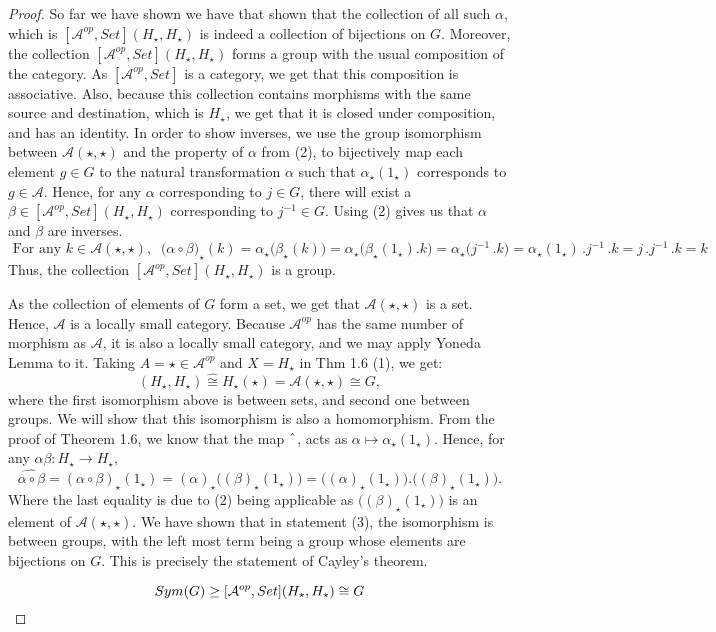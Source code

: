 \documentclass[18pt,a4paper]{article}
\theoremstyle{definition}
\begin{document}
\begin{proof}
		 So far we have shown we have that shown that the collection of all such $\alpha$,
		 which is $[\mathcal{A} ^{op},Set](H_\star,H_\star)$ is indeed a
		 collection of bijections on $G$.
		 Moreover, the collection $[\mathcal{A} ^{op},Set](H_\star, H_\star)$
		forms a group with the usual composition of the category.
		As $[\mathcal{A} ^{op},Set]$ is a category, we get that
		this composition is associative. Also, because this collection contains
		morphisms with the same source and destination, which is $H_\star$, we get that it is
		closed under composition, and has an identity.
		In order to show inverses, we use the group isomorphism between
		$\mathcal{A} (\star,\star)$ and	the property of $\alpha$ from (2),
		to bijectively map each element $g\in G$ to the natural transformation $\alpha$
		such that $\alpha_\star(1_\star)$ corresponds to $g \in \mathcal{A}$.
		Hence, for any $\alpha$ corresponding to $j\in G$, there will exist a
		$\beta \in [\mathcal{A} ^{op},Set](H_\star, H_\star)$ corresponding to $j^{-1} \in G$.
		Using (2) gives us that $\alpha$ and $\beta$ are inverses.
		\[ \text{ For any } k \in \mathcal{A} (\star,\star), \; \;
			\big( \alpha \circ \beta\big)_\star
			(k)
		= \alpha_\star\big(\beta_\star(k)\big)=\alpha_\star \big( \beta_\star(1_\star).k \big)
	=\alpha_\star \big( j^{-1}\,. k \big) = \alpha_\star(1_\star)\,.  j^{-1}\,. k=j\,. j^{-1}\,.
k=k\]
		Thus, the collection $[ \mathcal{A} ^{op}, Set](H_\star,H_\star)$ is a group.

		As the collection of elements of $G$ form a set, we get that $\mathcal{A}(\star,\star)$
		is a set. Hence, $\mathcal{A}$ is a locally small category. Because
		$\mathcal{A} ^{op}$ has the same number of morphism as $\mathcal{A}$,
		it is also a locally small category, and we may apply Yoneda Lemma to it.
		Taking $A=\star	\in \mathcal{A} ^{op}$ and $X=H_\star$ in Thm 1.6 (1), we get:
		\begin{equation} [ \mathcal{A} ^{op}, Set](H_\star,H_\star) \hat{\cong} H_\star(\star)
		= \mathcal{A} (\star,\star) \cong G, \end{equation}
		where the first isomorphism above is between sets, and second one between groups.
		We will show that this isomorphism is also a homomorphism.
		From the proof of Theorem 1.6, we know that the map
	$\string ^$, acts as $\alpha \mapsto \alpha_\star (1_\star)$. Hence, for any $\alpha
	\beta:H_\star
		\to H_\star$,
		\begin{equation}
			\widehat {\alpha \circ \beta}= (\alpha \circ \beta)_\star(1_\star)
			=(\alpha)_\star \Big( (\beta)_\star (1_\star) \Big)=
			\Big((\alpha)_\star(1_\star) \Big) . \Big( (\beta)_\star (1_\star) \Big).
		\end{equation}
		Where the last equality is due to (2) being applicable
		as $\Big((\beta)_\star (1_\star)\Big)$ is an element of $\mathcal{A} (\star,\star)$.
		We have shown that in statement (3), the isomorphism is between groups,
		with the left most term being a group whose elements are bijections
		on $G$. This is
		precisely the statement of Cayley's theorem.


		\[ Sym(G) \geq [ \mathcal{A} ^{op}, Set](H_\star,H_\star) \cong G \qedhere \]
	\end{proof}
\end{document}
